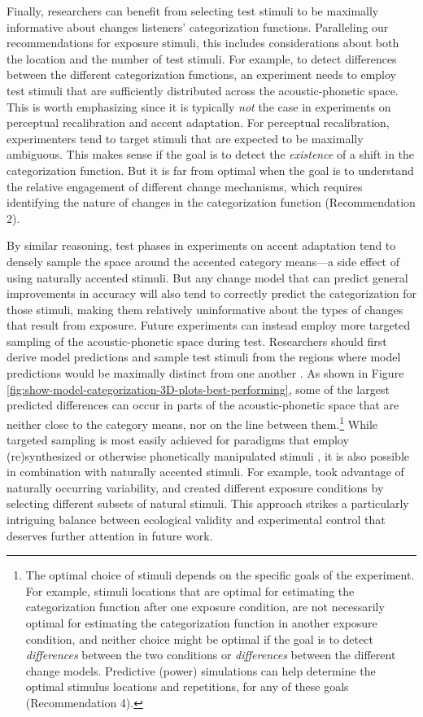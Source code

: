 \documentclass[
  11pt,
  man,floatsintext]{apa6}
\begin{document}
Finally, researchers can benefit from selecting test stimuli to be maximally informative about changes listeners' categorization functions. Paralleling our recommendations for exposure stimuli, this includes considerations about both the location and the number of test stimuli. For example, to detect differences between the different categorization functions, an experiment needs to employ test stimuli that are sufficiently distributed across the acoustic-phonetic space. This is worth emphasizing since it is typically \emph{not} the case in experiments on perceptual recalibration and accent adaptation. For perceptual recalibration, experimenters tend to target stimuli that are expected to be maximally ambiguous. This makes sense if the goal is to detect the \emph{existence} of a shift in the categorization function. But it is far from optimal when the goal is to understand the relative engagement of different change mechanisms, which requires identifying the nature of changes in the categorization function (Recommendation 2).

By similar reasoning, test phases in experiments on accent adaptation tend to densely sample the space around the accented category means---a side effect of using naturally accented stimuli. But any change model that can predict general improvements in accuracy will also tend to correctly predict the categorization for those stimuli, making them relatively uninformative about the types of changes that result from exposure. Future experiments can instead employ more targeted sampling of the acoustic-phonetic space during test. Researchers should first derive model predictions and sample test stimuli from the regions where model predictions would be maximally distinct from one another \autocite[for initial efforts along these lines, see][]{burchill-jaeger2022}. As shown in Figure \ref{fig:show-model-categorization-3D-plots-best-performing}, some of the largest predicted differences can occur in parts of the acoustic-phonetic space that are neither close to the category means, nor on the line between them.\footnote{The optimal choice of stimuli depends on the specific goals of the experiment. For example, stimuli locations that are optimal for estimating the categorization function after one exposure condition, are not necessarily optimal for estimating the categorization function in another exposure condition, and neither choice might be optimal if the goal is to detect \emph{differences} between the two conditions or \emph{differences} between the different change models. Predictive (power) simulations can help determine the optimal stimulus locations and repetitions, for any of these goals (Recommendation 4).} While targeted sampling is most easily achieved for paradigms that employ (re)synthesized or otherwise phonetically manipulated stimuli \autocites[for examples, see][]{bejjanki2011,burchill-jaeger2022,idemaru-holt2020}, it is also possible in combination with naturally accented stimuli. For example, \textcite{chodroff-wilson2020} took advantage of naturally occurring variability, and created different exposure conditions by selecting different subsets of natural stimuli. This approach strikes a particularly intriguing balance between ecological validity and experimental control that deserves further attention in future work.
\end{document}
